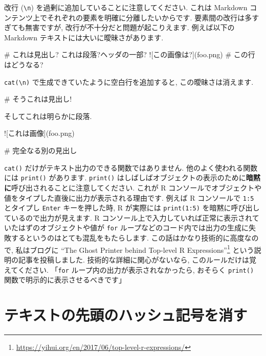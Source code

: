 \documentclass[
  11pt,
  lualatex,ja=standard,jafont=noto]{bxjsreport}
\newenvironment{Shaded}{\begin{snugshade}}{\end{snugshade}}
\newcommand{\AlertTok}[1]{\textcolor[rgb]{0.94,0.16,0.16}{#1}}
\newcommand{\FunctionTok}[1]{\textcolor[rgb]{0.00,0.00,0.00}{#1}}
\newcommand{\NormalTok}[1]{#1}
\renewcommand{\href}[2]{#2\footnote{\url{#1}}}
\begin{document}
改行 (\texttt{\textbackslash{}n}) を過剰に追加していることに注意してください. これは Markdown コンテンツ上でそれぞれの要素を明確に分離したいからです. 要素間の改行は多すぎても無害ですが, 改行が不十分だと問題が起こりえます. 例えば以下の Markdown テキストには大いに曖昧さがあります.

\begin{Shaded}
\begin{Highlighting}[]
\FunctionTok{\# これは見出し?}
\NormalTok{これは段落?ヘッダの一部?}
\AlertTok{![この画像は?](foo.png)}
\FunctionTok{\# この行はどうなる?}
\end{Highlighting}
\end{Shaded}

\texttt{cat(\textquotesingle{}\textbackslash{}n\textquotesingle{})} で生成できていたように空白行を追加すると, この曖昧さは消えます.

\begin{Shaded}
\begin{Highlighting}[]
\FunctionTok{\# そうこれは見出し!}

\NormalTok{そしてこれは明らかに段落.}

\AlertTok{![これは画像](foo.png)}

\FunctionTok{\# 完全なる別の見出し}
\end{Highlighting}
\end{Shaded}

\texttt{cat()} だけがテキスト出力のできる関数ではありません. 他のよく使われる関数には \texttt{print()} があります. \texttt{print()} はしばしばオブジェクトの表示のために\textbf{暗黙に}呼び出されることに注意してください. これが R コンソールでオブジェクトや値をタイプした直後に出力が表示される理由です. 例えば R コンソールで \texttt{1:5} とタイプし \texttt{Enter} キーを押した時, R が実際には \texttt{print(1:5)} を暗黙に呼び出しているので出力が見えます. R コンソール上で入力していれば正常に表示されていたはずのオブジェクトや値が \texttt{for} ループなどのコード内では出力の生成に失敗するというのはとても混乱をもたらします. この話はかなり技術的に高度なので, 私はブログに \href{https://yihui.org/en/2017/06/top-level-r-expressions/}{``The Ghost Printer behind Top-level R Expressions''} という説明の記事を投稿しました. 技術的な詳細に関心がないなら, このルールだけは覚えてください. 「\texttt{for} ループ内の出力が表示されなかったら, おそらく \texttt{print()} 関数で明示的に表示させるべきです」

\hypertarget{opts-comment}{%
\section{テキストの先頭のハッシュ記号を消す}\label{opts-comment}}
\end{document}

